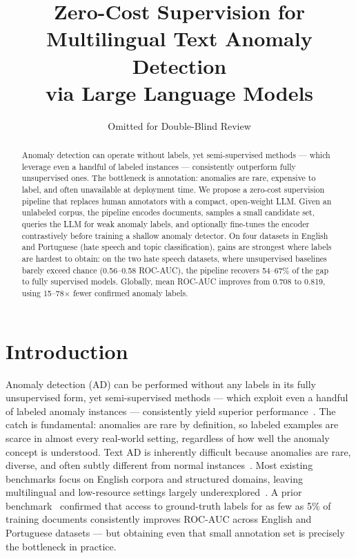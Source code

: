 \documentclass[12pt]{article}
\title{Zero-Cost Supervision for Multilingual Text Anomaly Detection\\via Large Language Models}
\author{Omitted for Double-Blind Review}
\begin{document}
\maketitle

\begin{abstract}
Anomaly detection can operate without labels, yet semi-supervised methods ---
which leverage even a handful of labeled instances --- consistently outperform
fully unsupervised ones. The bottleneck is annotation: anomalies are rare,
expensive to label, and often unavailable at deployment time.
We propose a zero-cost supervision pipeline that replaces human annotators with
a compact, open-weight LLM. Given an unlabeled corpus, the pipeline encodes
documents, samples a small candidate set, queries the LLM for weak anomaly
labels, and optionally fine-tunes the encoder contrastively before training a
shallow anomaly detector. On four datasets in English and Portuguese
(hate speech and topic classification), gains are strongest where labels are
hardest to obtain: on the two hate speech datasets, where unsupervised baselines
barely exceed chance (0.56--0.58 ROC-AUC), the pipeline recovers 54--67\% of
the gap to fully supervised models. Globally, mean ROC-AUC improves from 0.708
to 0.819, using 15--78$\times$ fewer confirmed anomaly labels.
\end{abstract}


\section{Introduction}

Anomaly detection (AD) can be performed without any labels
in its fully unsupervised form, yet semi-supervised methods --- which exploit even
a handful of labeled anomaly instances --- consistently yield superior
performance~\cite{pang2021deep, xu-etal-2023-comparative}.
The catch is fundamental: anomalies are rare by definition, so labeled
examples are scarce in almost every real-world setting, regardless of how
well the anomaly concept is understood.
Text AD is inherently difficult because anomalies are rare, diverse, and often
subtly different from normal instances~\cite{Chandola2009AnomalyDetection, pang2021deep}.
Most existing benchmarks focus on English corpora and structured domains,
leaving multilingual and low-resource settings largely underexplored~\cite{Boutalbi2023, xu-etal-2023-comparative}.
A prior benchmark~\cite{stil} confirmed that access to ground-truth labels for as
few as 5\% of training documents consistently improves ROC-AUC across English
and Portuguese datasets --- but obtaining even that small annotation set is
precisely the bottleneck in practice.
\end{document}
